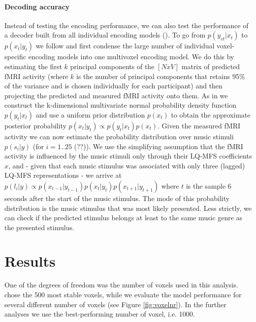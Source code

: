 \paragraph{Decoding accuracy}

Instead of testing the encoding performance, we can also test the performance of a decoder built from all individual encoding models (\cite{NG11}). To go from $p(y_{vt}|x_{t})$ to $p(x_{t}|y_{t})$ we follow \cite{NG09} and first condense the large number of individual voxel-specific encoding models into one multivoxel encoding model. We do this by estimating the first $k$ principal components of the $[N x V]$ matrix of predicted f{MRI} activity (where $k$ is the number of principal components that retains 95\% of the variance and is chosen individually for each participant) and then projecting the predicted and measured f{MRI} activity onto them. As in \cite{NG09} we construct the k-dimensional multivariate normal probability density function $p(y_{t}|x_{t})$ and use a uniform prior distribution $p(x_{t})$ to obtain the approximate posterior probability $p(x_{t}|y_{t}) \propto p(y_{t}|x_{t})p(x_{t})$. Given the measured f{MRI} activity we can now estimate the probability distribution over music stimuli $p(s_{i}|y)$ (for $i=1..25$ (??)). We use the simplifying assumption that the f{MRI} activity is influenced by the music stimuli only through their LQ-MFS coefficients $x$, and - given that each music stimulus was associated with only three (lagged) LQ-MFS representations - we arrive at $p(l_{i}|y) \propto p(x_{t-1}|y_{t-1})p(x_{t}|y_{t})p(x_{t+1}|y_{t+1})$ where $t$ is the sample 6 seconds after the start of the music stimulus. The mode of this probability distribution is the music stimulus that was most likely presented. Less strictly, we can check if the predicted stimulus belongs at least to the same music genre as the presented stimulus. 

\section*{Results}

One of the degrees of freedom was the number of voxels used in this analysis. \cite{ML08} chose the 500 most stable voxels, while we evaluate the model performance for several different number of voxels (see Figure \ref{fig:voxelnr}). In the further analyses we use the best-performing number of voxel, i.e. 1000.
	
